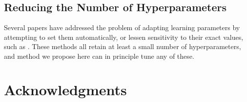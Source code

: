\documentclass{article}
\begin{document}
\subsection{Reducing the Number of Hyperparameters}
Several papers have addressed the problem of adapting learning parameters by attempting to set them automatically, or lessen sensitivity to their exact values, such as \cite{schaul2012no, Adam14, Adasecant14, Hotswap14}.
These methods all retain at least a small number of hyperparameters, and method we propose here can in principle tune any of these.


\section*{Acknowledgments} 
 




\end{document}
